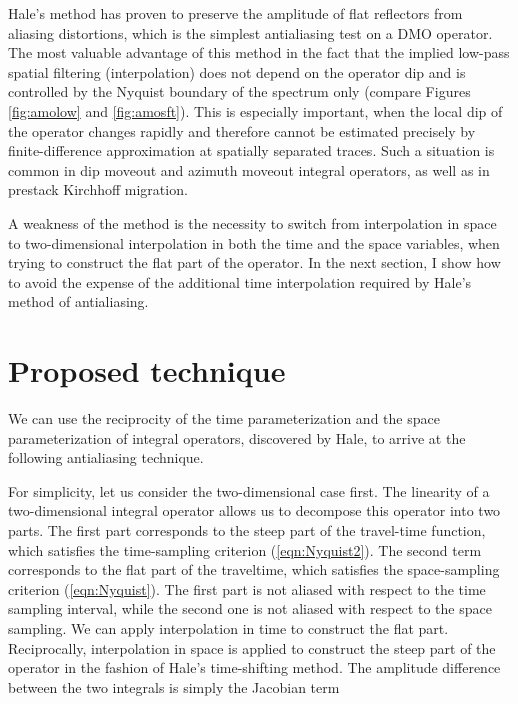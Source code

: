 Hale's method has proven to preserve the amplitude of flat reflectors
from aliasing distortions, which is the simplest antialiasing test on
a DMO operator. The most valuable advantage of this method in the fact
that the implied low-pass spatial filtering (interpolation) does not
depend on the operator dip and is controlled by the Nyquist boundary
of the spectrum only (compare Figures \ref{fig:amolow} and
\ref{fig:amosft}). This is especially important, when the local dip of
the operator changes rapidly and therefore cannot be estimated
precisely by finite-difference approximation at spatially separated
traces. Such a situation is common in dip moveout and azimuth moveout
integral operators, as well as in prestack Kirchhoff migration.

A weakness of the method is the necessity to switch from
interpolation in space to two-dimensional interpolation in both the
time and the space variables, when trying to construct the flat part
of the operator. 
In the next section, I show how to avoid the expense of the additional
time interpolation required by Hale's method of antialiasing.

\section{Proposed technique}
We can use the reciprocity of the time parameterization and the space
parameterization of integral operators, discovered by Hale, to arrive
at the following antialiasing technique.

For simplicity, let us consider the two-dimensional case first.  The
linearity of a two-dimensional integral operator allows us to
decompose this operator into two parts. The first part corresponds to
the steep part of the travel-time function, which satisfies the
time-sampling criterion (\ref{eqn:Nyquist2}). The second term
corresponds to the flat part of the traveltime, which satisfies the
space-sampling criterion (\ref{eqn:Nyquist}). The first part is not
aliased with respect to the time sampling interval, while the second
one is not aliased with respect to the space sampling. We can apply
interpolation in time to construct the flat part.  Reciprocally,
interpolation in space is applied to construct the steep part of the
operator in the fashion of Hale's time-shifting method. 
The amplitude
difference between the two integrals is simply the Jacobian term

